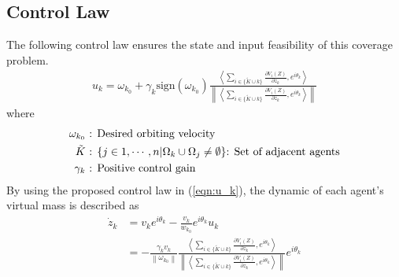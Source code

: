 \documentclass[journal]{IEEEtran}
\newcommand{\norm}[1]{\left\lVert#1\right\rVert}
\begin{document}
	\subsection{Control Law}
	The following control law ensures the state and input feasibility of this coverage problem. 
	\begin{equation}
	\label{eqn:u_k}
	\begin{split}
	u_k = \omega_{k_0} + \gamma_k \text{sign}({\omega_{k_0}}) \frac{\left <\sum\limits_{i \in \{\tilde{K} \cup k\}}\frac{\partial V_i(Z)}{\partial z_k}, e^{i\theta_k} \right >}{\norm{\left <\sum\limits_{i \in \{\tilde{K} \cup k\}}\frac{\partial V_i(Z)}{\partial z_k}, e^{i\theta_k} \right >}} 
	\end{split}
	\end{equation}
	\noindent where 
	\begin{equation} \notag
	\begin{split}
	\omega_{k_0} &  \text{ : Desired orbiting velocity} \\
	\tilde{K} & \text{ : } \{ j \in {1,\cdots,n}| \Omega_k \cup \Omega_j \neq \emptyset \} \text{: Set of adjacent agents}\\
	\gamma_k & \text{ : Positive control gain} 
	\end{split}
	\end{equation}
	By using the proposed control law in (\ref{eqn:u_k}), the dynamic of each agent's virtual mass is described as 
	\begin{equation} \label{eqn:z_k}
	\begin{split}
	\dot{z}_{k}  & = v_k e^{i\theta_{k}} - \frac{v_k}{w_{k_0}}e^{i\theta_{k}}u_k \\
	& = - \frac{\gamma_k v_k}{\norm{\omega_{k_0}}}\frac{\left <\sum\limits_{i \in \{\tilde{K} \cup k\}}\frac{\partial V_i(Z)}{\partial z_k}, e^{i\theta_k} \right >}{\norm{\left <\sum\limits_{i \in \{\tilde{K} \cup k\}}\frac{\partial V_i(Z)}{\partial z_k}, e^{i\theta_k} \right >}}e^{i\theta_{k}} \\
	\end{split}
	\end{equation}
	
\end{document}
